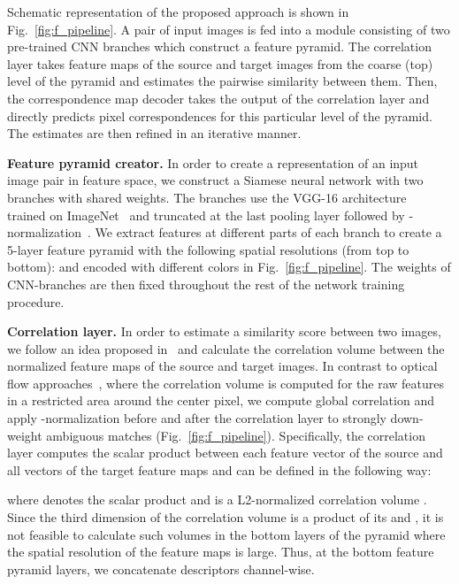 \documentclass[10pt,twocolumn,letterpaper]{article}
\begin{document}
Schematic representation of the proposed approach is shown in Fig.~\ref{fig:f_pipeline}. A pair of input images is fed into a module consisting of two pre-trained CNN branches which construct a feature pyramid. The correlation layer takes feature maps of the source and target images from the coarse (top) level of the pyramid and estimates the pairwise similarity between them. Then, the correspondence map decoder takes the output of the correlation layer and directly predicts pixel correspondences for this particular level of the pyramid. The estimates are then refined in an iterative manner. 

\noindent\textbf{Feature pyramid creator.}
In order to create a representation of an input image pair in feature space, we construct a Siamese neural network with two branches with shared weights. The branches use the VGG-16 architecture~\cite{vgg} trained on ImageNet~\cite{imagenet} and truncated at the last pooling layer followed by -normalization~\cite{Rocco17}. We extract features  at different parts of each branch to create a 5-layer feature pyramid with the following spatial resolutions (from top to bottom):  and encoded with different colors in Fig.~\ref{fig:f_pipeline}. The weights of CNN-branches are then fixed throughout the rest of the network training procedure.

\noindent\textbf{Correlation layer.} In order to estimate a similarity score between two images, we follow an idea proposed in~\cite{Rocco17} and calculate the correlation volume between the normalized feature maps of the source and target images. In contrast to optical flow approaches~\cite{FlowNet2,PWC-Net}, where the correlation volume is computed for the raw features in a restricted area around the center pixel, we compute global correlation and apply -normalization before and after the correlation layer to strongly down-weight ambiguous matches (\cf Fig.~\ref{fig:f_pipeline}). Specifically, the correlation layer computes the scalar product between each feature vector of the source  and all vectors of the target  feature maps  and can be defined in the following way:


\noindent where  denotes the scalar product and  is a L2-normalized correlation volume . Since the third dimension of the correlation volume is a product of its  and , it is not feasible to calculate such volumes in the bottom layers of the pyramid where the spatial resolution of the feature maps is large. Thus, at the bottom feature pyramid layers, we concatenate descriptors channel-wise.
\end{document}
